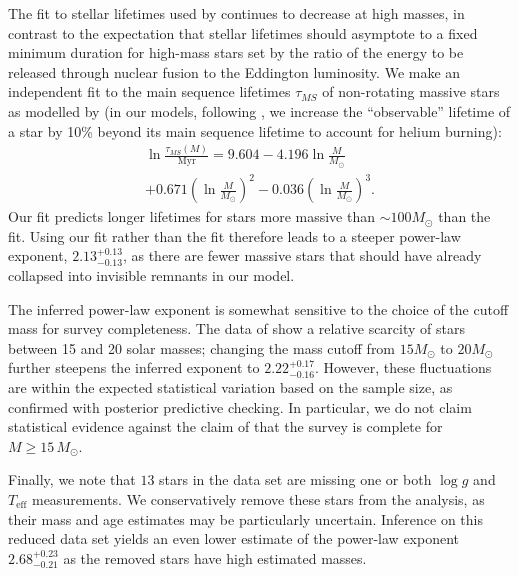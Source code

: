 \documentclass[apjl]{emulateapj}
\newcommand{\MSun}{M_\odot}
\newcommand{\onesigrange}[3]{\ensuremath{#1^{+#2}_{-#3}}}
\newcommand{\alpharangetwo}{\onesigrange{2.13}{0.13}{0.13}}
\newcommand{\alpharangethree}{\onesigrange{2.22}{0.17}{0.16}}
\newcommand{\alpharangefour}{\onesigrange{2.68}{0.23}{0.21}}
\begin{document}
The fit to stellar lifetimes used by \citet{Schneider:2018} continues to
decrease at high masses, in contrast to the expectation that stellar lifetimes
should asymptote to a fixed minimum duration for high-mass stars set by the
ratio of the energy to be released through nuclear fusion to the Eddington
luminosity.  We make an independent fit to the main sequence lifetimes
$\tau_{MS}$ of non-rotating massive stars as modelled by \citet{Brott:2011} (in
our models, following \citet{Schneider:2018}, we increase the ``observable''
lifetime of a star by 10\% beyond its main sequence lifetime to account for
helium burning):
%
\begin{multline}
\ln \frac{\tau_{MS} (M)}{\textrm{Myr}} = 9.604 - 4.196 \ln\frac{M}{M_\odot} \\ + 0.671 \left(\ln\frac{M}{M_\odot} \right)^2 - 0.036 \left(\ln\frac{M}{M_\odot}\right)^3.
\end{multline}
%
Our fit predicts longer lifetimes for stars more massive than $\sim 100 M_\odot$
than the \citet{Schneider:2018} fit.  Using our fit rather than the
\citet{Schneider:2018} fit therefore leads to a steeper power-law exponent,
$\alpharangetwo$, as there are fewer massive stars that should have already
collapsed into invisible remnants in our model.

The inferred power-law exponent is somewhat sensitive to
the choice of the cutoff mass for survey completeness.  The data of \citet{Schneider:2018} show a relative scarcity of stars between 15 and 20 solar masses; changing the mass cutoff from $15 M_\odot$ to $20 M_\odot$ further steepens the inferred exponent to $\alpharangethree$.    However, these fluctuations are within the expected statistical
variation based on the sample size, as confirmed with posterior predictive
checking.  In particular, we do not claim statistical evidence against the claim of \citet{Schneider:2018} that
the survey is complete for $M \geq 15 \, \MSun$.

Finally, we note that $13$ stars in the \citet{Schneider:2018} data set are
missing one or both $\log g$ and $T_\textrm{eff}$ measurements.  We
conservatively remove these stars from the analysis, as their mass and age
estimates may be particularly uncertain.  Inference on this reduced data set
yields an even lower estimate of the power-law exponent $\alpharangefour$ as
the removed stars have high estimated masses.
\end{document}
